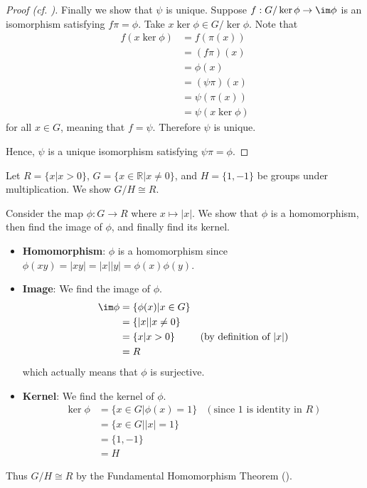 \begin{proof}[Proof (cf. {\cite[p.~250, Theorem 2]{cohn_1982}})]
    Finally we show that $\psi$ is unique. Suppose $f: G/\ker\phi \to \im\phi$ is an isomorphism satisfying $f\pi=\phi$. Take $x\ker\phi \in G/\ker\phi$. Note that
    \begin{align*}
        f(x\ker\phi) &= f(\pi(x))\\
        &= (f\pi)(x)\\
        &= \phi(x)\\
        &= (\psi\pi)(x)\\
        &= \psi(\pi(x))\\
        &= \psi(x\ker\phi)
    \end{align*}
    for all $x \in G$, meaning that $f = \psi$. Therefore $\psi$ is unique.

    Hence, $\psi$ is a unique isomorphism satisfying $\psi\pi = \phi$.
\end{proof}

\begin{example}
    Let $R = \{x \vert x > 0\}$, $G = \{x \in \mathbb{R} \vert x \neq 0\}$, and $H = \{1, -1\}$ be groups under multiplication. We show $G / H \cong R$.

    Consider the map $\phi: G \to R$ where $x \mapsto |x|$. We show that $\phi$ is a homomorphism, then find the image of $\phi$, and finally find its kernel.
    \begin{itemize}
        \item \textbf{Homomorphism}: $\phi$ is a homomorphism since $\phi(xy) = |xy| = |x||y| = \phi(x)\phi(y)$.
        \item \textbf{Image}: We find the image of $\phi$.
        \begin{align*}
            \im\phi &= \{\phi(x) \vert x \in G\}\\
            &= \{|x| \vert x \neq 0\}\\
            &= \{x \vert x > 0\} & (\text{by definition of } |x|)\\
            &= R
        \end{align*}
        which actually means that $\phi$ is surjective.
        \item \textbf{Kernel}: We find the kernel of $\phi$.
        \begin{align*}
            \ker\phi &= \{x \in G \vert \phi(x) = 1\} & (\text{since } 1 \text{ is identity in } R)\\
            &= \{x \in G \vert |x| = 1\}\\
            &= \{1, -1\}\\
            &= H
        \end{align*}
    \end{itemize}
    Thus $G/H \cong R$ by the Fundamental Homomorphism Theorem ().
\end{example}

